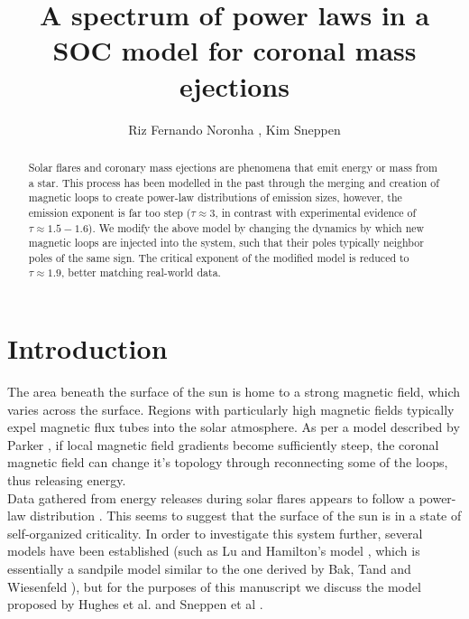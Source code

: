 \documentclass[aps, pre, reprint]{revtex4-2}
\begin{document}
\title{A spectrum of power laws in a SOC model for coronal mass ejections}
\author{Riz Fernando Noronha , Kim Sneppen }

\begin{abstract}
    Solar flares and coronary mass ejections are phenomena that emit energy or mass from a star. This process has been modelled in the past through the merging and creation of magnetic loops to create power-law distributions of emission sizes, however, the emission exponent is far too step ($\tau\approx$3, in contrast with experimental evidence of $\tau\approx1.5-1.6$). We modify the above model by changing the dynamics by which new magnetic loops are injected into the system, such that their poles typically neighbor poles of the same sign. The critical exponent of the modified model is reduced to $\tau\approx 1.9$, better matching real-world data.
\end{abstract}


\maketitle



\section{Introduction}



The area beneath the surface of the sun is home to a strong magnetic field, which varies across the surface. Regions with particularly high magnetic fields typically expel magnetic flux tubes into the solar atmosphere. As per a model described by Parker \cite{ParkerSolarFlares}, if local magnetic field gradients become sufficiently steep, the coronal magnetic field can change it's topology through reconnecting some of the loops, thus releasing energy. \\

Data gathered from energy releases during solar flares appears to follow a power-law distribution \cite{NishizukaXRay, AschwandenSolarFlareData}. This seems to suggest that the surface of the sun is in a state of self-organized criticality. In order to investigate this system further, several models have been established (such as Lu and Hamilton's model \cite{LuHamiltonSandpile}, which is essentially a sandpile model similar to the one derived by Bak, Tand and Wiesenfeld \cite{BakSandpile}), but for the purposes of this manuscript we discuss the model proposed by Hughes et al. \cite{HughesSolarFlares} and Sneppen et al \cite{sneppenTrusinaMeanFieldBipartite}. \\
\end{document}
